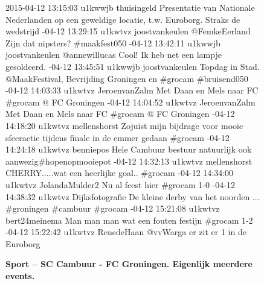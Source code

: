 {{\vspace*{-17pt} 
\begin{figure}[H]
 \caption{\bf{Sport} – SC Cambuur - FC Groningen. Eigenlijk meerdere events.}
\vspace*{-10pt} 
\begin{framed}
\footnotesize{
2015-04-12 13:15:03 u1kwwjb thuisingeld Presentatie van Nationale Nederlanden op een geweldige locatie, t.w. Euroborg. Straks de wedstrijd
-04-12 13:29:15 u1kwtvz joostvankeulen @FemkeEerland Zijn dat nipsters? \#maakfest050
-04-12 13:42:11 u1kwwjb joostvankeulen @annewillucas Cool! Ik heb net een lampje gesoldeerd.
-04-12 13:45:51 u1kwwjb joostvankeulen Topdag in Stad. @MaakFestival, Bevrijding Groningen en \#grocam \#bruisend050
-04-12 14:03:33 u1kwtvz JeroenvanZalm Met Daan en Mels naar FC \#grocam @ FC Groningen
-04-12 14:04:52 u1kwtvz JeroenvanZalm Met Daan en Mels naar FC \#grocam @ FC Groningen
-04-12 14:18:20 u1kwtvz mellenshorst Zojuist mijn bijdrage voor mooie sfeeractie tijdens finale in de emmer gedaan \#grocam
-04-12 14:24:18 u1kwtvz benniepos Hele Cambuur bestuur natuurlijk ook aanwezig\#hopenopmooiepot
-04-12 14:32:13 u1kwtvz mellenshorst CHERRY.....wat een heerlijke goal.. \#grocam
-04-12 14:34:00 u1kwtvz JolandaMulder2 Nu al feest hier \#grocam 1-0
-04-12 14:38:32 u1kwtvz Dijksfotografie De kleine derby van het noorden ... \#groningen \#cambuur \#grocam
-04-12 15:21:08 u1kwtvz bert24meinema Man man man wat een fouten festijn \#grocam 1-2
-04-12 15:22:42 u1kwtvz RenedeHaan @vvWarga er zit er 1 in de Euroborg
}
 \end{framed}
\end{figure}

}}
